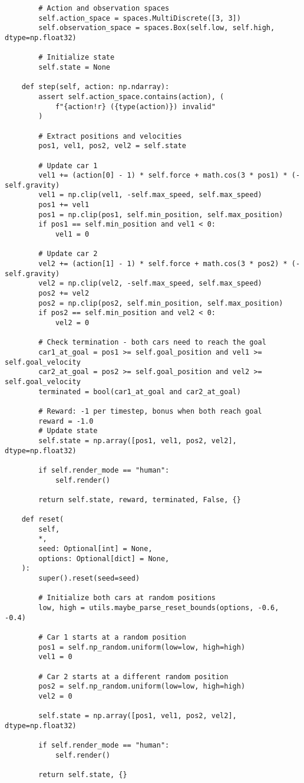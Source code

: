 \begin{verbatim}
        # Action and observation spaces
        self.action_space = spaces.MultiDiscrete([3, 3])
        self.observation_space = spaces.Box(self.low, self.high, dtype=np.float32)

        # Initialize state
        self.state = None

    def step(self, action: np.ndarray):
        assert self.action_space.contains(action), (
            f"{action!r} ({type(action)}) invalid"
        )

        # Extract positions and velocities
        pos1, vel1, pos2, vel2 = self.state

        # Update car 1
        vel1 += (action[0] - 1) * self.force + math.cos(3 * pos1) * (-self.gravity)
        vel1 = np.clip(vel1, -self.max_speed, self.max_speed)
        pos1 += vel1
        pos1 = np.clip(pos1, self.min_position, self.max_position)
        if pos1 == self.min_position and vel1 < 0:
            vel1 = 0

        # Update car 2
        vel2 += (action[1] - 1) * self.force + math.cos(3 * pos2) * (-self.gravity)
        vel2 = np.clip(vel2, -self.max_speed, self.max_speed)
        pos2 += vel2
        pos2 = np.clip(pos2, self.min_position, self.max_position)
        if pos2 == self.min_position and vel2 < 0:
            vel2 = 0

        # Check termination - both cars need to reach the goal
        car1_at_goal = pos1 >= self.goal_position and vel1 >= self.goal_velocity
        car2_at_goal = pos2 >= self.goal_position and vel2 >= self.goal_velocity
        terminated = bool(car1_at_goal and car2_at_goal)

        # Reward: -1 per timestep, bonus when both reach goal
        reward = -1.0
        # Update state
        self.state = np.array([pos1, vel1, pos2, vel2], dtype=np.float32)

        if self.render_mode == "human":
            self.render()

        return self.state, reward, terminated, False, {}

    def reset(
        self,
        *,
        seed: Optional[int] = None,
        options: Optional[dict] = None,
    ):
        super().reset(seed=seed)

        # Initialize both cars at random positions
        low, high = utils.maybe_parse_reset_bounds(options, -0.6, -0.4)

        # Car 1 starts at a random position
        pos1 = self.np_random.uniform(low=low, high=high)
        vel1 = 0

        # Car 2 starts at a different random position
        pos2 = self.np_random.uniform(low=low, high=high)
        vel2 = 0

        self.state = np.array([pos1, vel1, pos2, vel2], dtype=np.float32)

        if self.render_mode == "human":
            self.render()

        return self.state, {}
\end{verbatim}
